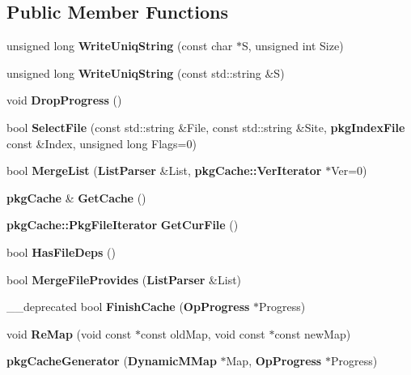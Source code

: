 \subsection*{\-Public \-Member \-Functions}
\begin{DoxyCompactItemize}
\item 
unsigned long {\bfseries \-Write\-Uniq\-String} (const char $\ast$\-S, unsigned int \-Size)\label{classpkgCacheGenerator_a7d30e2b172fba6814b3d036cfd9d5edf}

\item 
unsigned long {\bfseries \-Write\-Uniq\-String} (const std\-::string \&\-S)\label{classpkgCacheGenerator_a719101e204c7d768eb83f569f661e9d2}

\item 
void {\bfseries \-Drop\-Progress} ()\label{classpkgCacheGenerator_a9e6c2051cbbbe399ad28805a908720b1}

\item 
bool {\bfseries \-Select\-File} (const std\-::string \&\-File, const std\-::string \&\-Site, {\bf pkg\-Index\-File} const \&\-Index, unsigned long \-Flags=0)\label{classpkgCacheGenerator_a365d7792c781439110235ca8673851e9}

\item 
bool {\bfseries \-Merge\-List} ({\bf \-List\-Parser} \&\-List, {\bf pkg\-Cache\-::\-Ver\-Iterator} $\ast$\-Ver=0)\label{classpkgCacheGenerator_a36c93f7c08685409866d6083e2f5b585}

\item 
{\bf pkg\-Cache} \& {\bfseries \-Get\-Cache} ()\label{classpkgCacheGenerator_ab7db5f7135c4de2154b90ce5c4c326af}

\item 
{\bf pkg\-Cache\-::\-Pkg\-File\-Iterator} {\bfseries \-Get\-Cur\-File} ()\label{classpkgCacheGenerator_a40db53df5eac7bf93ef11529cbd8003f}

\item 
bool {\bfseries \-Has\-File\-Deps} ()\label{classpkgCacheGenerator_a9e0b5c33f099ed1cee4a02f892862459}

\item 
bool {\bfseries \-Merge\-File\-Provides} ({\bf \-List\-Parser} \&\-List)\label{classpkgCacheGenerator_a0d6d1ea554c8eaec868bcee5e91bc20d}

\item 
\-\_\-\-\_\-deprecated bool {\bfseries \-Finish\-Cache} ({\bf \-Op\-Progress} $\ast$\-Progress)\label{classpkgCacheGenerator_a5b7d3450e96d26765d877c99f1024c76}

\item 
void {\bfseries \-Re\-Map} (void const $\ast$const old\-Map, void const $\ast$const new\-Map)\label{classpkgCacheGenerator_ae37a14c2c94c62271aa78b4df3c0d6dd}

\item 
{\bfseries pkg\-Cache\-Generator} ({\bf \-Dynamic\-M\-Map} $\ast$\-Map, {\bf \-Op\-Progress} $\ast$\-Progress)\label{classpkgCacheGenerator_ad50e7e3c632b9fa793ded0cc81a697b9}

\end{DoxyCompactItemize}
